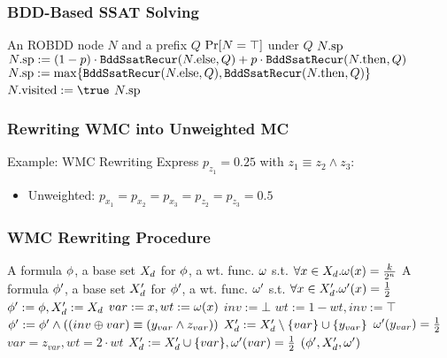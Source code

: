 \begin{frame}
    \frametitle{BDD-Based SSAT Solving}
    {
        \small
        \begin{algorithmic}[1]
            \REQUIRE An ROBDD node $N$ and a prefix $Q$
            \ENSURE $\Pr[N=\top]$ under $Q$
            \RETURN $N.\mathrm{sp}$
            \ENDIF
            \alert{\STATE $N.\mathrm{sp}:=(1-p)\cdot\texttt{BddSsatRecur}(N.\mathrm{else},Q)+p\cdot\texttt{BddSsatRecur}(N.\mathrm{then},Q)$}
            \ELSE
            \alert{\STATE $N.\mathrm{sp}:=\max\{\texttt{BddSsatRecur}(N.\mathrm{else},Q),\texttt{BddSsatRecur}(N.\mathrm{then},Q)\}$}
            \ENDIF
            \STATE $\nodevisit{N} := \true$
            \ENDIF
            \RETURN $N.\mathrm{sp}$
        \end{algorithmic}
    }
\end{frame}

\begin{frame}
    \frametitle{Rewriting WMC into Unweighted MC}
    \begin{block}{Example: WMC Rewriting}
        Express $p_{z_1}=0.25$ with $z_1\equiv z_2\land z_3$:
        \begin{figure}
            \centering
            
        \end{figure}
        \begin{itemize}
            \item Unweighted: $p_{x_1}=p_{x_2}=p_{x_3}=p_{z_2}=p_{z_3}=0.5$
        \end{itemize}
    \end{block}
\end{frame}

\begin{frame}
    \frametitle{WMC Rewriting Procedure}
    {
        \scriptsize
        \begin{algorithmic}[1]
            \REQUIRE A formula $\phi$, a base set $X_d$ for $\phi$,
            a wt. func. $\omega$ s.t. $\forall x\in X_d.\omega(x)=\frac{k}{2^n}$
            \ENSURE A formula $\phi'$, a base set $X_d'$ for $\phi'$,
            a wt. func. $\omega'$ s.t. $\forall x\in X_d'.\omega'(x)=\frac{1}{2}$
            \STATE $\phi':=\phi,X_d':=X_d$
            \STATE $var:=x,wt:=\omega(x)$
            \STATE $inv:=\bot$
            \STATE $wt:=1-wt,inv:=\top$
            \ENDIF
            \STATE $\phi':=\phi'\land((inv \oplus var) \equiv (y_{var} \land z_{var}))$
            \STATE $X_d':=X_d'\setminus\{var\}\cup\{y_{var}\}$
            \STATE $\omega'(y_{var})=\frac{1}{2}$
            \STATE $var=z_{var},wt=2 \cdot wt$
            \ENDWHILE
            \STATE $X_d':=X_d'\cup\{var\},\omega'(var)=\frac{1}{2}$
            \ENDFOR
            \RETURN $(\phi',X_d',\omega')$
        \end{algorithmic}
    }
\end{frame}

